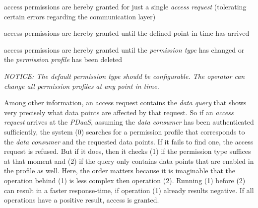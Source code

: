 \documentclass[12pt,english,a4paper,titlepage,cleardoublepage=empty,dottedtoc]{report}
\providecommand{\tightlist}{%
  \setlength{\itemsep}{0pt}\setlength{\parskip}{0pt}}
\begin{document}
\begin{description}
\tightlist
\item[\emph{one-time-only}]
access permissions are hereby granted for just a single \emph{access
request} (tolerating certain errors regarding the communication layer)
\item[\emph{expires-on-date}]
access permissions are hereby granted until the defined point in time
has arrived
\item[\emph{until-further-notice}]
access permissions are hereby granted until the \emph{permission type}
has changed or the \emph{permission profile} has been deleted
\end{description}

\emph{NOTICE: The default permission type should be configurable. The
operator can change all permission profiles at any point in time.}

Among other information, an access request contains the \emph{data
query} that shows very precisely what data points are affected by that
request. So if an \emph{access request} arrives at the \emph{PDaaS},
assuming the \emph{data consumer} has been authenticated sufficiently,
the system (0) searches for a permission profile that corresponds to the
\emph{data consumer} and the requested data points. If it fails to find
one, the access request is refused. But if it does, then it checks (1)
if the permission type suffices at that moment and (2) if the query only
contains data points that are enabled in the profile as well. Here, the
order matters because it is imaginable that the operation behind (1) is
less complex then operation (2). Running (1) before (2) can result in a
faster response-time, if operation (1) already results negative. If all
operations have a positive result, access is granted.
\end{document}

